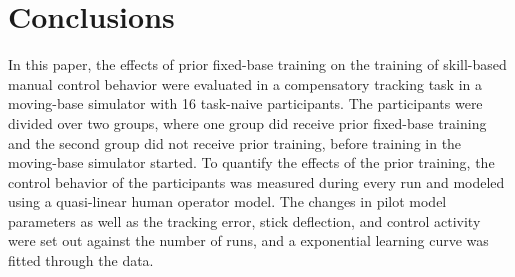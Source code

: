 \documentclass[conference]{IEEEtran}
\begin{document}
\section{Conclusions}
In this paper, the effects of prior fixed-base training on the training of skill-based manual control behavior were evaluated in a compensatory tracking task in a moving-base simulator with 16 task-naive participants. The participants were divided over two groups, where one group did receive prior fixed-base training and the second group did not receive prior training, before training in the moving-base simulator started. To quantify the effects of the prior training, the control behavior of the participants was measured during every run and modeled using a quasi-linear human operator model. The changes in pilot model parameters as well as the tracking error, stick deflection, and control activity were set out against the number of runs, and a exponential learning curve was fitted through the data. 
















%
%
%
\end{document}
